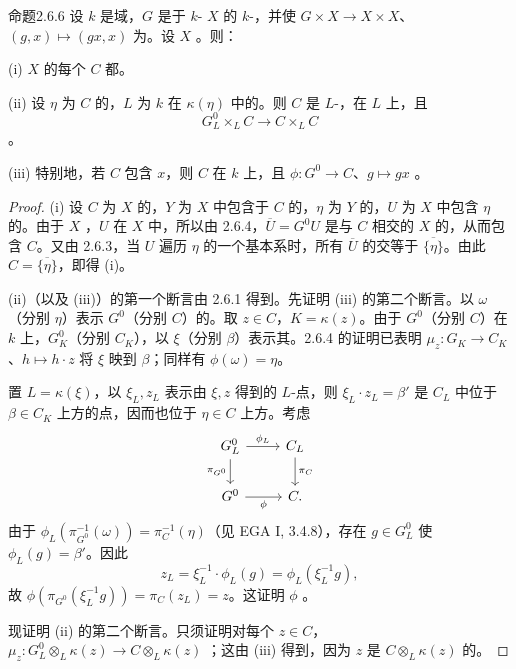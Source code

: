 \begin{SGAresult}{命题}{2.6.6}
设 $k$ 是域，$G$ 是于 $k$- $X$ 的 $k$-，并使 $G\times X\to X\times X$、$(g,x)\mapsto(gx,x)$ 为。设 $X$ 。则：

(i) $X$ 的每个 $C$ 都。

(ii) 设 $\eta$ 为 $C$ 的，$L$ 为 $k$ 在 $\kappa(\eta)$ 中的。则 $C$ 是 $L$-，在 $L$ 上，且
\[
G^0_L\times_L C\longrightarrow C\times_L C
\]
。

(iii) 特别地，若 $C$ 包含 $x$，则 $C$ 在 $k$ 上，且 $\phi:G^0\to C$、$g\mapsto gx$ 。
\end{SGAresult}
\begin{proof}
(i) 设 $C$ 为 $X$ 的，$Y$ 为 $X$ 中包含于 $C$ 的，$\eta$ 为 $Y$ 的，$U$ 为 $X$ 中包含 $\eta$ 的。由于 $X$ ，$U$ 在 $X$ 中，所以由 2.6.4，$\overline U=G^0U$ 是与 $C$ 相交的 $X$ 的，从而包含 $C$。又由 2.6.3，当 $U$ 遍历 $\eta$ 的一个基本系时，所有 $\overline U$ 的交等于 $\overline{\{\eta\}}$。由此 $C=\overline{\{\eta\}}$，即得 (i)。

(ii)（以及 (iii)）的第一个断言由 2.6.1 得到。先证明 (iii) 的第二个断言。以 $\omega$（分别 $\eta$）表示 $G^0$（分别 $C$）的。取 $z\in C$，$K=\kappa(z)$。由于 $G^0$（分别 $C$）在 $k$ 上，$G^0_K$（分别 $C_K$），以 $\xi$（分别 $\beta$）表示其。2.6.4 的证明已表明 $\mu_z:G_K\to C_K$、$h\mapsto h\cdot z$ 将 $\xi$ 映到 $\beta$；同样有 $\phi(\omega)=\eta$。

置 $L=\kappa(\xi)$，以 $\xi_L,z_L$ 表示由 $\xi,z$ 得到的 $L$-点，则 $\xi_L\cdot z_L=\beta'$ 是 $C_L$ 中位于 $\beta\in C_K$ 上方的点，因而也位于 $\eta\in C$ 上方。考虑
\[
\begin{tikzcd}
G^0_L\arrow[r,"\phi_L"]\arrow[d,"\pi_{G^0}"']&C_L\arrow[d,"\pi_C"]\\
G^0\arrow[r,"\phi"']&C.
\end{tikzcd}
\]
由于 $\phi_L(\pi_{G^0}^{-1}(\omega))=\pi_C^{-1}(\eta)$（见 EGA I, 3.4.8），存在 $g\in G^0_L$ 使 $\phi_L(g)=\beta'$。因此
\[
z_L=\xi_L^{-1}\cdot\phi_L(g)=\phi_L(\xi_L^{-1}g),
\]
故 $\phi(\pi_{G^0}(\xi_L^{-1}g))=\pi_C(z_L)=z$。这证明 $\phi$ 。

现证明 (ii) 的第二个断言。只须证明对每个 $z\in C$， $\mu_z:G^0_L\otimes_L\kappa(z)\to C\otimes_L\kappa(z)$ ；这由 (iii) 得到，因为 $z$ 是 $C\otimes_L\kappa(z)$ 的。
\end{proof}
